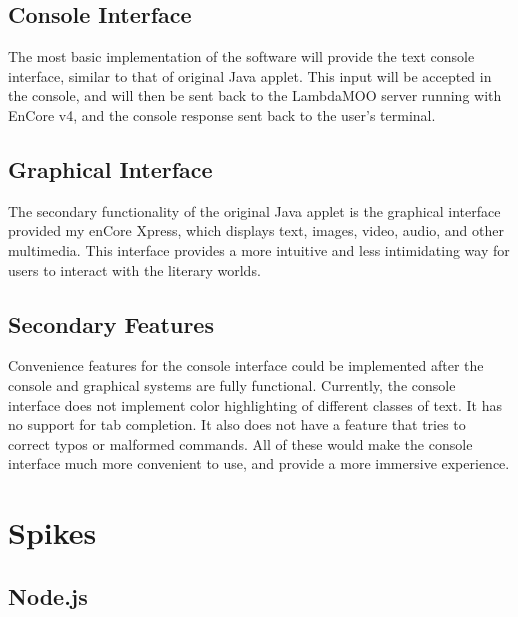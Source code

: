 \documentclass[12pt, letterpaper]{report}
\begin{document}
\section{Console Interface}
The most basic implementation of the software will provide the text console interface, similar to that of original Java applet. This input will be accepted in the console, and will then be sent back to the LambdaMOO server running with EnCore v4, and the console response sent back to the user's terminal.

\section{Graphical Interface}
The secondary functionality of the original Java applet is the graphical interface provided my enCore Xpress, which displays text, images, video, audio, and other multimedia. This interface provides a more intuitive and less intimidating way for users to interact with the literary worlds. 

\section{Secondary Features}
Convenience features for the console interface could be implemented after the console and graphical systems are fully functional. Currently, the console interface does not implement color highlighting of different classes of text. It has no support for tab completion. It also does not have a feature that tries to correct typos or malformed commands. All of these would make the console interface much more convenient to use, and provide a more immersive experience.

\par



\chapter{Spikes}
\section{Node.js}


\end{document}
